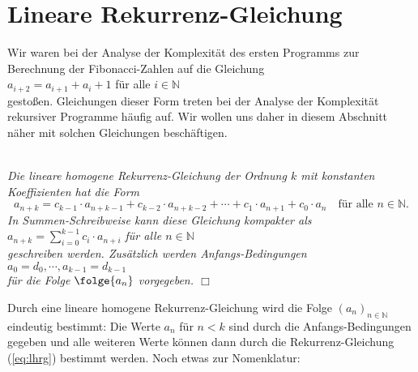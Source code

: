 \section{Lineare Rekurrenz-Gleichung \label{sec:lineare-RG}}
Wir waren bei der Analyse der Komplexität des ersten Programms zur Berechnung der
Fibonacci-Zahlen auf die Gleichung \\[0.2cm]
\hspace*{1.3cm} $a_{i+2} = a_{i+1} + {a_i} + 1$ \quad für alle $i \in \mathbb{N}$ \\[0.2cm]
gestoßen. Gleichungen dieser Form treten bei der Analyse der Komplexität rekursiver
Programme häufig auf. Wir wollen uns daher in diesem Abschnitt näher mit solchen
Gleichungen beschäftigen.

\begin{Definition} \hspace*{\fill} \\
{\em 
  Die \emph{lineare homogene Rekurrenz-Gleichung der Ordnung $k$ mit konstanten Koeffizienten} hat die Form
  \begin{equation}
    \label{eq:lhrg}
  a_{n+k} = c_{k-1} \cdot a_{n+k-1} + c_{k-2} \cdot a_{n+k-2} + \cdots + c_1 \cdot a_{n+1} + c_0 \cdot a_{n}
     \quad \mbox{für alle $n \in \mathbb{N}$}. 
  \end{equation}
     In Summen-Schreibweise kann diese Gleichung kompakter als 
     \\[0.2cm]
     \hspace*{1.3cm}
     $a_{n+k} = \sum\limits_{i=0}^{k-1} c_i \cdot a_{n+i}$ \quad für alle $n \in \mathbb{N}$
     \\[0.2cm]
     geschreiben werden.
     Zusätzlich werden \emph{Anfangs-Bedingungen}  
      \\[0.2cm]
      \hspace*{1.3cm}      
      $a_0 = d_0, \cdots, a_{k-1} = d_{k-1}$ 
      \\[0.2cm]
      für die Folge $\folge{a_n}$ vorgegeben.    
    \hspace*{\fill} $\Box$
}
\end{Definition}
Durch eine lineare homogene Rekurrenz-Gleichung wird die Folge $(a_n)_{n\in\mathbb{N}}$
eindeutig bestimmt: Die Werte $a_n$ für $n < k$ sind durch die Anfangs-Bedingungen gegeben und
alle weiteren Werte können dann durch die Rekurrenz-Gleichung (\ref{eq:lhrg}) bestimmt werden.
Noch  etwas zur Nomenklatur:
